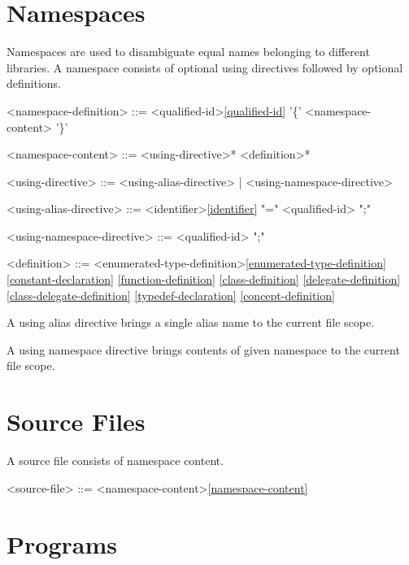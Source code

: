 \documentclass[a4paper,oneside,11pt]{article}
\begin{document}
\section{Namespaces}

Namespaces are used to disambiguate equal names belonging to different libraries.
A namespace consists of optional using directives followed by optional definitions.

\begin{grammar}
\label{namespace-definition}<namespace-definition> ::=  <qualified-id>\ref{qualified-id} '\{' <namespace-content> '\}'

\label{namespace-content}<namespace-content> ::= <using-directive>* <definition>*

<using-directive> ::= <using-alias-directive> | <using-namespace-directive>

<using-alias-directive> ::=  <identifier>\ref{identifier} "=" <qualified-id> ";"

<using-namespace-directive> ::=  <qualified-id> ";"

<definition> ::= <enumerated-type-definition>\ref{enumerated-type-definition}
\ref{constant-declaration}
\ref{function-definition}
\ref{class-definition}
\ref{delegate-definition}
\ref{class-delegate-definition}
\ref{typedef-declaration}
\ref{concept-definition}
\end{grammar}

A using alias directive brings a single alias name to the current file scope.

A using namespace directive brings contents of given namespace to the current file scope.

\section{Source Files}

A source file consists of namespace content.

\begin{grammar}
<source-file> ::= <namespace-content>\ref{namespace-content}
\end{grammar}

\section{Programs}
\end{document}
